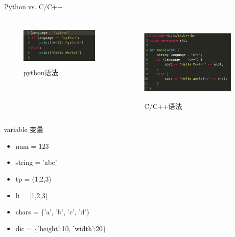 \documentclass[aspectratio=169]{beamer}
\begin{document}
    \begin{frame}{Python vs. C/C++}
      \begin{columns}
      \begin{column}[t]{0.5\textwidth}
        \begin{figure}
        \includegraphics[height=2.17cm, width=5cm]{python-hello.png}
        \caption{python语法} 
        \end{figure}
        
      \end{column}

      \begin{column}[t]{0.5\textwidth}
        \begin{figure}
        \includegraphics[height=3.98cm, width=6cm]{hello-c++.png}
        \caption{C/C++语法} 
        \end{figure}
        
      \end{column}

      \end{columns}
      
      
    \end{frame}

    

    \begin{frame}{variable 变量}
      \begin{itemize}
        \item num = 123
        \item string = 'abc'
        \item tp = (1,2,3)
        \item li = [1,2,3]
        \item chars = \{'a', 'b', 'c', 'd'\}
        \item dic = \{'height':10, 'width':20\}
      \end{itemize}
      
    \end{frame}
\end{document}
